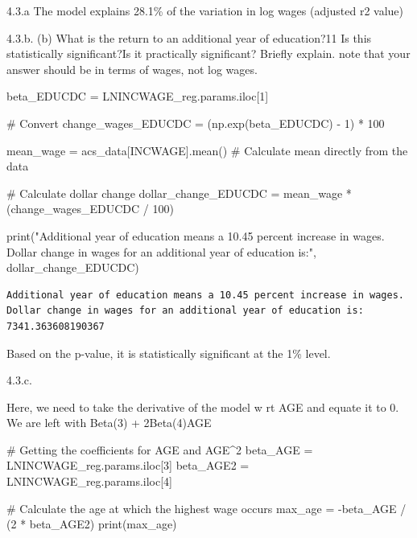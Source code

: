\documentclass[
  11pt,
  letterpaper,
  DIV=11,
  numbers=noendperiod]{scrartcl}
\newenvironment{Shaded}{\begin{snugshade}}{\end{snugshade}}
\newcommand{\BuiltInTok}[1]{\textcolor[rgb]{0.00,0.23,0.31}{#1}}
\newcommand{\CommentTok}[1]{\textcolor[rgb]{0.37,0.37,0.37}{#1}}
\newcommand{\DecValTok}[1]{\textcolor[rgb]{0.68,0.00,0.00}{#1}}
\newcommand{\NormalTok}[1]{\textcolor[rgb]{0.00,0.23,0.31}{#1}}
\newcommand{\OperatorTok}[1]{\textcolor[rgb]{0.37,0.37,0.37}{#1}}
\newcommand{\StringTok}[1]{\textcolor[rgb]{0.13,0.47,0.30}{#1}}
\begin{document}
4.3.a The model explains 28.1\% of the variation in log wages (adjusted
r2 value)

4.3.b. (b) What is the return to an additional year of education?11 Is
this statistically significant?Is it practically significant? Briefly
explain. note that your answer should be in terms of wages, not log
wages.

\begin{Shaded}
\begin{Highlighting}[]
\NormalTok{beta\_EDUCDC }\OperatorTok{=}\NormalTok{ LNINCWAGE\_reg.params.iloc[}\DecValTok{1}\NormalTok{]}

\CommentTok{\# Convert}
\NormalTok{change\_wages\_EDUCDC }\OperatorTok{=}\NormalTok{ (np.exp(beta\_EDUCDC) }\OperatorTok{{-}} \DecValTok{1}\NormalTok{) }\OperatorTok{*} \DecValTok{100}

\NormalTok{mean\_wage }\OperatorTok{=}\NormalTok{ acs\_data[}\StringTok{\textquotesingle{}INCWAGE\textquotesingle{}}\NormalTok{].mean()  }\CommentTok{\# Calculate mean directly from the data}

\CommentTok{\# Calculate dollar change}
\NormalTok{dollar\_change\_EDUCDC }\OperatorTok{=}\NormalTok{ mean\_wage }\OperatorTok{*}\NormalTok{ (change\_wages\_EDUCDC }\OperatorTok{/} \DecValTok{100}\NormalTok{)}

\BuiltInTok{print}\NormalTok{(}\StringTok{"Additional year of education means a 10.45 percent increase in wages. Dollar change in wages for an additional year of education is:"}\NormalTok{, dollar\_change\_EDUCDC)}
\end{Highlighting}
\end{Shaded}

\begin{verbatim}
Additional year of education means a 10.45 percent increase in wages. Dollar change in wages for an additional year of education is: 7341.363608190367
\end{verbatim}

Based on the p-value, it is statistically significant at the 1\% level.

4.3.c.

Here, we need to take the derivative of the model w rt AGE and equate it
to 0. We are left with Beta(3) + 2Beta(4)AGE

\begin{Shaded}
\begin{Highlighting}[]
\CommentTok{\# Getting the coefficients for AGE and AGE\^{}2}
\NormalTok{beta\_AGE }\OperatorTok{=}\NormalTok{ LNINCWAGE\_reg.params.iloc[}\DecValTok{3}\NormalTok{]      }
\NormalTok{beta\_AGE2 }\OperatorTok{=}\NormalTok{ LNINCWAGE\_reg.params.iloc[}\DecValTok{4}\NormalTok{]  }

\CommentTok{\# Calculate the age at which the highest wage occurs}
\NormalTok{max\_age }\OperatorTok{=} \OperatorTok{{-}}\NormalTok{beta\_AGE }\OperatorTok{/}\NormalTok{ (}\DecValTok{2} \OperatorTok{*}\NormalTok{ beta\_AGE2)}
\BuiltInTok{print}\NormalTok{(max\_age)}
\end{Highlighting}
\end{Shaded}
\end{document}
